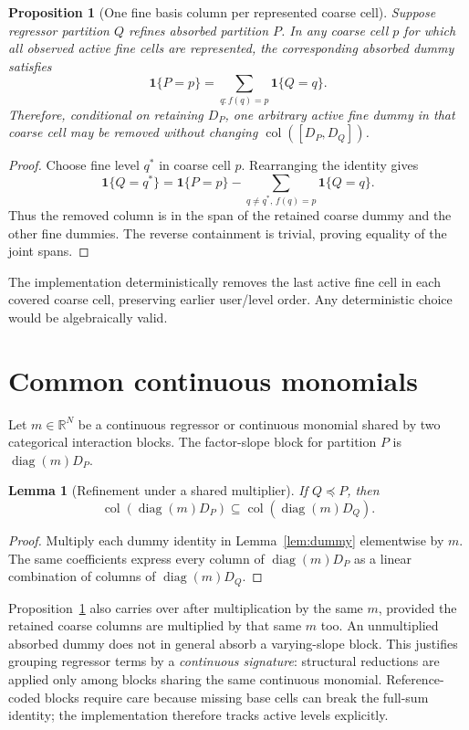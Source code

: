 \documentclass[11pt]{article}
\newtheorem{proposition}[theorem]{Proposition}
\newtheorem{lemma}[theorem]{Lemma}
\theoremstyle{definition}
\newcommand{\R}{\mathbb{R}}
\newcommand{\col}{\operatorname{col}}
\newcommand{\diag}{\operatorname{diag}}
\newcommand{\1}{\mathbf{1}}
\begin{document}
\begin{proposition}[One fine basis column per represented coarse cell]\label{prop:basis}
Suppose regressor partition $Q$ refines absorbed partition $P$. In any coarse cell $p$ for which all observed active fine cells are represented, the corresponding absorbed dummy satisfies
\[
  \1\{P=p\}=\sum_{q:f(q)=p}\1\{Q=q\}.
\]
Therefore, conditional on retaining $D_P$, one arbitrary active fine dummy in that coarse cell may be removed without changing $\col([D_P,D_Q])$.
\end{proposition}
\begin{proof}
Choose fine level $q^*$ in coarse cell $p$. Rearranging the identity gives
\[
  \1\{Q=q^*\}=\1\{P=p\}-\sum_{q\ne q^*,\,f(q)=p}\1\{Q=q\}.
\]
Thus the removed column is in the span of the retained coarse dummy and the other fine dummies. The reverse containment is trivial, proving equality of the joint spans.
\end{proof}

The implementation deterministically removes the last active fine cell in each covered coarse cell, preserving earlier user/level order. Any deterministic choice would be algebraically valid.

\section{Common continuous monomials}

Let $m\in\R^N$ be a continuous regressor or continuous monomial shared by two categorical interaction blocks. The factor-slope block for partition $P$ is $\diag(m)D_P$.

\begin{lemma}[Refinement under a shared multiplier]\label{lem:slope}
If $Q\preceq P$, then
\[
  \col(\diag(m)D_P)\subseteq\col(\diag(m)D_Q).
\]
\end{lemma}
\begin{proof}
Multiply each dummy identity in Lemma~\ref{lem:dummy} elementwise by $m$. The same coefficients express every column of $\diag(m)D_P$ as a linear combination of columns of $\diag(m)D_Q$.
\end{proof}

Proposition~\ref{prop:basis} also carries over after multiplication by the same $m$, provided the retained coarse columns are multiplied by that same $m$ too. An unmultiplied absorbed dummy does not in general absorb a varying-slope block. This justifies grouping regressor terms by a \emph{continuous signature}: structural reductions are applied only among blocks sharing the same continuous monomial. Reference-coded blocks require care because missing base cells can break the full-sum identity; the implementation therefore tracks active levels explicitly.
\end{document}
